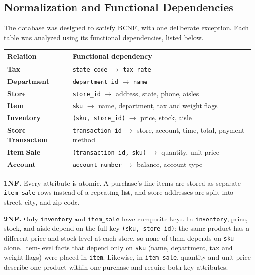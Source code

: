 \documentclass[11pt,letterpaper]{article}
\begin{document}
\subsection{Normalization and Functional Dependencies}
\label{sec:normalization}

The database was designed to satisfy BCNF, with one deliberate exception. Each table was analyzed using its functional dependencies, listed below.

\renewcommand{\arraystretch}{1.16}
\begin{center}
\footnotesize
\begin{tabularx}{\textwidth}{@{}>{\bfseries}p{}>{\raggedright\arraybackslash}X@{}}
\hline
Relation & Functional dependency \\ \hline
Tax & \texttt{state\_code} $\rightarrow$ \texttt{tax\_rate} \\
Department & \texttt{department\_id} $\rightarrow$ \texttt{name} \\
Store & \texttt{store\_id} $\rightarrow$ address, state, phone, aisles \\
Item & \texttt{sku} $\rightarrow$ name, department, tax and weight flags \\
Inventory & \texttt{(sku, store\_id)} $\rightarrow$ price, stock, aisle \\
Store Transaction & \texttt{transaction\_id} $\rightarrow$ store, account, time, total, payment method \\
Item Sale & \texttt{(transaction\_id, sku)} $\rightarrow$ quantity, unit price \\
Account & \texttt{account\_number} $\rightarrow$ balance, account type \\ \hline
\end{tabularx}
\end{center}

\textbf{1NF.} Every attribute is atomic. A purchase's line items are stored as separate \texttt{item\_sale} rows instead of a repeating list, and store addresses are split into street, city, and zip code.

\textbf{2NF.} Only \texttt{inventory} and \texttt{item\_sale} have composite keys. In \texttt{inventory}, price, stock, and aisle depend on the full key \texttt{(sku, store\_id)}: the same product has a different price and stock level at each store, so none of them depends on \texttt{sku} alone. Item-level facts that depend only on \texttt{sku} (name, department, tax and weight flags) were placed in \texttt{item}. Likewise, in \texttt{item\_sale}, quantity and unit price describe one product within one purchase and require both key attributes.
\end{document}
